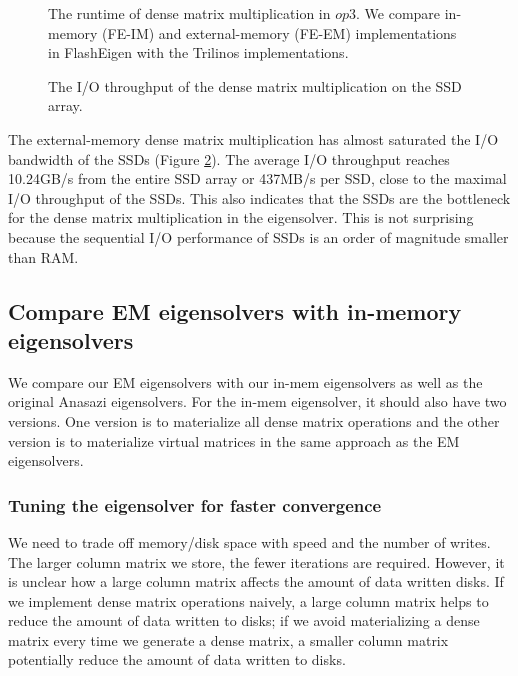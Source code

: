 \begin{figure}
	\begin{center}
		\footnotesize
		\vspace{-15pt}
		
		\vspace{-15pt}
		\caption{The runtime of dense matrix multiplication in $op3$. We compare
			in-memory (FE-IM) and external-memory (FE-EM) implementations
			in FlashEigen with the Trilinos implementations.}
		\label{perf:mvtransmv}
	\end{center}
\end{figure}

\begin{figure}
	\begin{center}
		\footnotesize
		\vspace{-15pt}
		
		\vspace{-15pt}
		\caption{The I/O throughput of the dense matrix multiplication
		on the SSD array.}
		\label{perf:dmm_io}
	\end{center}
\end{figure}

The external-memory dense matrix multiplication has almost saturated
the I/O bandwidth of the SSDs (Figure \ref{perf:dmm_io}). The average
I/O throughput reaches 10.24GB/s from the entire SSD array or 437MB/s
per SSD, close to the maximal I/O throughput of the SSDs.
This also indicates that the SSDs are the bottleneck for
the dense matrix multiplication in the eigensolver. This is not
surprising because the sequential I/O performance of SSDs is an order of
magnitude smaller than RAM. 

\subsection{Compare EM eigensolvers with in-memory eigensolvers}
We compare our EM eigensolvers with our in-mem eigensolvers as well as the original
Anasazi eigensolvers. For the in-mem eigensolver, it should also have two versions.
One version is to materialize all dense matrix operations and the other version is
to materialize virtual matrices in the same approach as the EM eigensolvers.

\subsubsection{Tuning the eigensolver for faster convergence}
We need to trade off memory/disk space with speed and the number of writes.
The larger column matrix we store, the fewer iterations are required. However,
it is unclear how a large column matrix affects the amount of data written disks.
If we implement dense matrix operations naively, a large column matrix helps to
reduce the amount of data written to disks; if we avoid materializing a dense
matrix every time we generate a dense matrix, a smaller column matrix potentially
reduce the amount of data written to disks.

